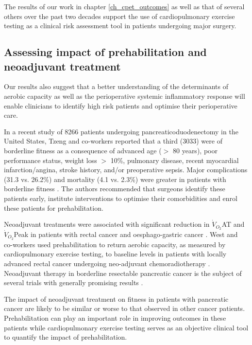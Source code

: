 The results of our work in chapter \ref{ch_cpet_outcomes} as well as that of several others over the past two decades support the use of cardiopulmonary exercise testing as a clinical risk assessment tool in patients undergoing major surgery.

\subsection{Assessing impact of prehabilitation and neoadjuvant treatment}

Our results also suggest that a better understanding of the determinants of aerobic capacity as well as the perioperative systemic inflammatory response will enable clinicians to identify high risk patients and optimise their perioperative care.

In a recent study of 8266 patients undergoing pancreaticoduodenectomy in the United States, Tzeng and co-workers reported that a third (3033) were of borderline fitness as a consequence of advanced age ($>$ 80 years), poor performance status, weight loss $>$ 10\%, pulmonary disease, recent myocardial infarction/angina, stroke history, and/or preoperative sepsis. 
Major complications (31.3 vs. 26.2\%) and mortality (4.1 vs. 2.3\%) were greater in patients with borderline fitness \parencite{tzeng_morbidity_2014}.
The authors recommended that surgeons identify these patients early, institute interventions to optimise their comorbidities and enrol these patients for prehabilitation. 

Neoadjuvant treatments were associated with significant reduction in $\dot{V}_{O_2}$AT and $\dot{V}_{O_2}$Peak in patients with rectal cancer \parencite{west_effects_2014} and oesphago-gastric cancer \parencite{jack_effect_2014}.
West and co-workers used prehabilitation to return aerobic capacity, as measured by cardiopulmonary exercise testing, to baseline levels in patients with locally advanced rectal cancer undergoing neo-adjuvant chemoradiotherapy \parencite{west_effect_2015}.
Neoadjuvant therapy in borderline resectable pancreatic cancer is the subject of several trials with generally promising results \parencite{evans_preoperative_2008, gillen_preoperative/neoadjuvant_2010, golcher_neoadjuvant_2015, kim_multi-institutional_2013, sahora_phase_2014}.

The impact of neoadjuvant treatment on fitness in patients with pancreatic cancer are likely to be similar or worse to that observed in other cancer patients.
Prehabilitation can play an important role in improving outcomes in these patients while cardiopulmonary exercise testing serves as an objective clinical tool to quantify the impact of prehabilitation.

